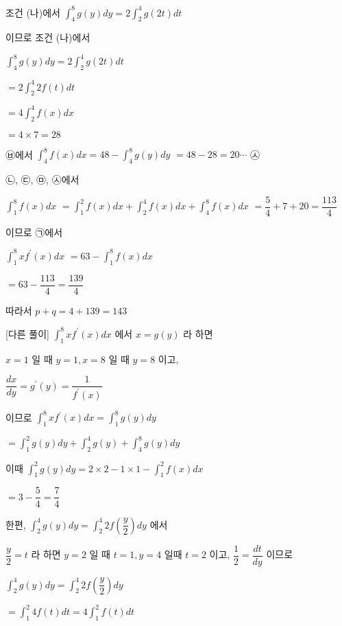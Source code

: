 \documentclass{oblivoir}
\begin{document}
조건 (나)에서 $\displaystyle\int_{4}^{8} g(y) d y=2 \displaystyle\int_{2}^{4} g(2 t) d t$

이므로 조건 (나)에서

$\displaystyle\int_{4}^{8} g(y) d y=2 \displaystyle\int_{2}^{4} g(2 t) d t$

$=2 \displaystyle\int_{2}^{4} 2 f(t) d t$

$=4 \displaystyle\int_{2}^{4} f(x) d x$

$=4 \times 7=28$

㉥에서 $\displaystyle\int_{4}^{8} f(x) d x=48-\displaystyle\int_{4}^{8} g(y) d y$ $=48-28=20 \cdots$ ㉦

㉡, ㉢, ㉤, ㉦에서

$\displaystyle\int_{1}^{8} f(x) d x$ $=\displaystyle\int_{1}^{2} f(x) d x+\displaystyle\int_{2}^{4} f(x) d x+\displaystyle\int_{4}^{8} f(x) d x$ $=\dfrac{5}{4}+7+20=\dfrac{113}{4}$

이므로 ㉠에서

$\displaystyle\int_{1}^{8} x f^{\prime}(x) d x$ $=63-\displaystyle\int_{1}^{8} f(x) d x$

$=63-\dfrac{113}{4}=\dfrac{139}{4}$

따라서
$p+q=4+139=143$

[다른 풀이]
$\displaystyle\int_{1}^{8} x f^{\prime}(x) d x$ 에서 $x=g(y)$ 라 하면

$x=1$ 일 때 $y=1, x=8$ 일 때 $y=8$ 이고,

$\dfrac{d x}{d y}=g^{\prime}(y)=\dfrac{1}{f^{\prime}(x)}$

이므로
$\displaystyle\int_{1}^{8} x f^{\prime}(x) d x=\displaystyle\int_{1}^{8} g(y) d y$

$=\displaystyle\int_{1}^{2} g(y) d y+\displaystyle\int_{2}^{4} g(y)+\displaystyle\int_{4}^{8} g(y) d y$

이때
$\displaystyle\int_{1}^{2} g(y) d y=2 \times 2-1 \times 1-\displaystyle\int_{1}^{2} f(x) d x$

$=3-\dfrac{5}{4}=\dfrac{7}{4}$

한편, $\displaystyle\int_{2}^{4} g(y) d y=\displaystyle\int_{2}^{4} 2 f\left(\dfrac{y}{2}\right) d y$ 에서

$\dfrac{y}{2}=t$ 라 하면 $y=2$ 일 때 $t=1, y=4$ 일때 $t=2$ 이고, $\dfrac{1}{2}=\dfrac{d t}{d y}$ 이므로

$\displaystyle\int_{2}^{4} g(y) d y=\displaystyle\int_{2}^{4} 2 f\left(\dfrac{y}{2}\right) d y$

$=\displaystyle\int_{1}^{2} 4 f(t) d t=4 \displaystyle\int_{1}^{2} f(t) d t$
\end{document}
